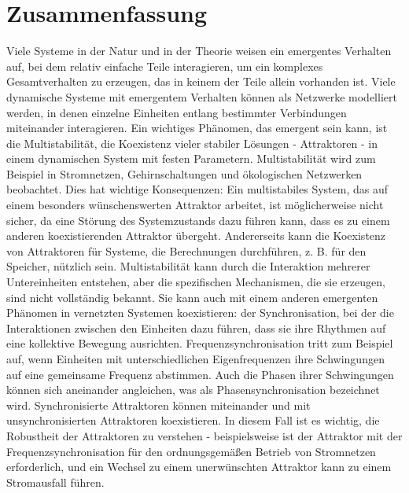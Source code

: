 \section*{Zusammenfassung}

Viele Systeme in der Natur und in der Theorie weisen ein emergentes Verhalten auf, bei dem relativ einfache Teile interagieren, um ein komplexes Gesamtverhalten zu erzeugen, das in keinem der Teile allein vorhanden ist. Viele dynamische Systeme mit emergentem Verhalten können als Netzwerke modelliert werden, in denen einzelne Einheiten entlang bestimmter Verbindungen miteinander interagieren. Ein wichtiges Phänomen, das emergent sein kann, ist die Multistabilität, die Koexistenz vieler stabiler Lösungen - Attraktoren - in einem dynamischen System mit festen Parametern. Multistabilität wird zum Beispiel in Stromnetzen, Gehirnschaltungen und ökologischen Netzwerken beobachtet. Dies hat wichtige Konsequenzen: Ein multistabiles System, das auf einem besonders wünschenswerten Attraktor arbeitet, ist möglicherweise nicht sicher, da eine Störung des Systemzustands dazu führen kann, dass es zu einem anderen koexistierenden Attraktor übergeht. Andererseits kann die Koexistenz von Attraktoren für Systeme, die Berechnungen durchführen, z. B. für den Speicher, nützlich sein. Multistabilität kann durch die Interaktion mehrerer Untereinheiten entstehen, aber die spezifischen Mechanismen, die sie erzeugen, sind nicht vollständig bekannt. Sie kann auch mit einem anderen emergenten Phänomen in vernetzten Systemen koexistieren: der Synchronisation, bei der die Interaktionen zwischen den Einheiten dazu führen, dass sie ihre Rhythmen auf eine kollektive Bewegung ausrichten. Frequenzsynchronisation tritt zum Beispiel auf, wenn Einheiten mit unterschiedlichen Eigenfrequenzen ihre Schwingungen auf eine gemeinsame Frequenz abstimmen. Auch die Phasen ihrer Schwingungen können sich aneinander angleichen, was als Phasensynchronisation bezeichnet wird.  Synchronisierte Attraktoren können miteinander und mit unsynchronisierten Attraktoren koexistieren. In diesem Fall ist es wichtig, die Robustheit der Attraktoren zu verstehen - beispielsweise ist der Attraktor mit der Frequenzsynchronisation für den ordnungsgemäßen Betrieb von Stromnetzen erforderlich, und ein Wechsel zu einem unerwünschten Attraktor kann zu einem Stromausfall führen. 

